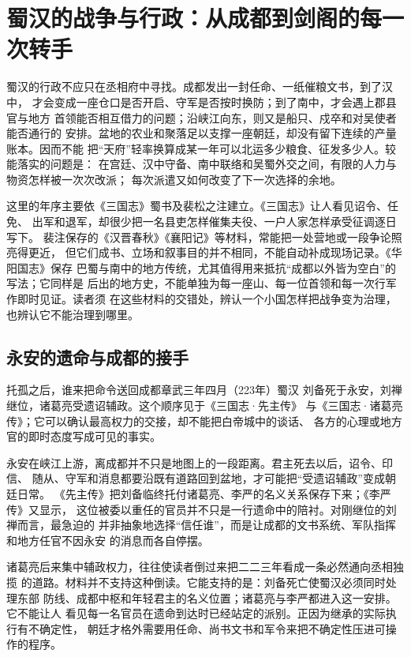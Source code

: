 \section{蜀汉的战争与行政：从成都到剑阁的每一次转手}

蜀汉的行政不应只在丞相府中寻找。成都发出一封任命、一纸催粮文书，到了汉中，
才会变成一座仓口是否开启、守军是否按时换防；到了南中，才会遇上郡县官与地方
首领能否相互借力的问题；沿峡江向东，则又是船只、戍卒和对吴使者能否通行的
安排。盆地的农业和聚落足以支撑一座朝廷，却没有留下连续的产量账本。因而不能
把“天府”轻率换算成某一年可以北运多少粮食、征发多少人。较能落实的问题是：
在宫廷、汉中守备、南中联络和吴蜀外交之间，有限的人力与物资怎样被一次次改派；
每次派遣又如何改变了下一次选择的余地。

这里的年序主要依《三国志》蜀书及裴松之注建立。《三国志》让人看见诏令、任免、
出军和退军，却很少把一名县吏怎样催集夫役、一户人家怎样承受征调逐日写下。
裴注保存的《汉晋春秋》《襄阳记》等材料，常能把一处营地或一段争论照亮得更近，
但它们成书、立场和叙事目的并不相同，不能自动补成现场记录。《华阳国志》保存
巴蜀与南中的地方传统，尤其值得用来抵抗“成都以外皆为空白”的写法；它同样是
后出的地方史，不能单独为每一座山、每一位首领和每一次行军作即时见证。读者须
在这些材料的交错处，辨认一个小国怎样把战争变为治理，也辨认它不能治理到哪里。

\subsection{永安的遗命与成都的接手}

\begin{event}{托孤之后，谁来把命令送回成都}{章武三年四月（223年）}{蜀汉}{}
刘备死于永安，刘禅继位，诸葛亮受遗诏辅政。这个顺序见于《三国志·先主传》
与《三国志·诸葛亮传》；它可以确认最高权力的交接，却不能把白帝城中的谈话、
各方的心理或地方官的即时态度写成可见的事实。
\end{event}

永安在峡江上游，离成都并不只是地图上的一段距离。君主死去以后，诏令、印信、
随从、守军和消息都要沿既有道路回到盆地，才可能把“受遗诏辅政”变成朝廷日常。
《先主传》把刘备临终托付诸葛亮、李严的名义关系保存下来；《李严传》又显示，
这位被委以重任的官员并不只是一行遗命中的陪衬。对刚继位的刘禅而言，最急迫的
并非抽象地选择“信任谁”，而是让成都的文书系统、军队指挥和地方任官不因永安
的消息而各自停摆。

诸葛亮后来集中辅政权力，往往使读者倒过来把二二三年看成一条必然通向丞相独揽
的道路。材料并不支持这种倒读。它能支持的是：刘备死亡使蜀汉必须同时处理东部
防线、成都中枢和年轻君主的名义位置；诸葛亮与李严都进入这一安排。它不能让人
看见每一名官员在遗命到达时已经站定的派别。正因为继承的实际执行有不确定性，
朝廷才格外需要用任命、尚书文书和军令来把不确定性压进可操作的程序。

